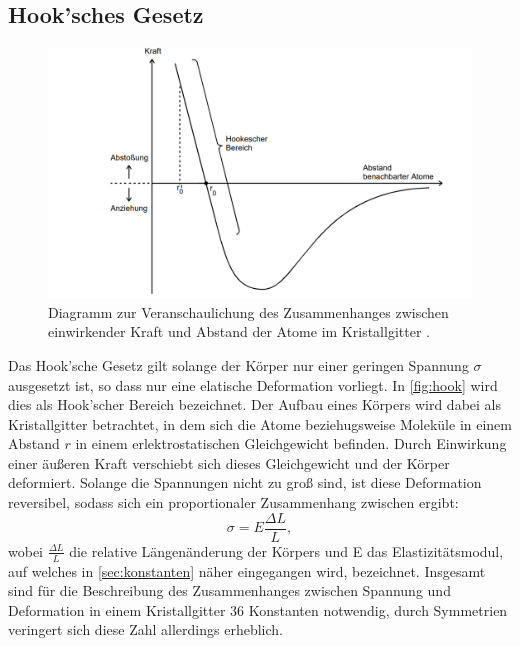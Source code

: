     \subsection{Hook'sches Gesetz}
    \label{sec:hook}
    \begin{figure}
        \centering
        \includegraphics[width=\textwidth]{content/hook.png}
        \caption{Diagramm zur Veranschaulichung des Zusammenhanges zwischen einwirkender Kraft und Abstand der Atome im Kristallgitter \cite[93]{V102}.}
        \label{fig:hook}
    \end{figure}
    Das Hook'sche Gesetz gilt solange der Körper nur einer geringen Spannung $\sigma$ ausgesetzt ist, so dass nur eine elatische 
    Deformation vorliegt. In \autoref{fig:hook} wird dies als Hook'scher Bereich bezeichnet. Der Aufbau eines Körpers wird dabei
    als Kristallgitter betrachtet, in dem sich die Atome beziehugsweise Moleküle in einem Abstand $r$ in einem erlektrostatischen
    Gleichgewicht befinden. Durch Einwirkung einer äußeren Kraft verschiebt sich dieses Gleichgewicht und der Körper deformiert.
    Solange die Spannungen nicht zu groß sind, ist diese Deformation reversibel, sodass sich ein proportionaler Zusammenhang zwischen
    ergibt:
    \begin{equation}
    \label{eqn:hook}
        \sigma = E \frac {\Delta L} {L},
    \end{equation}     
    wobei $\frac {\Delta L}{L}$ die relative Längenänderung der Körpers und E das Elastizitätsmodul, auf welches in \autoref{sec:konstanten}
    näher eingegangen wird, bezeichnet.
    Insgesamt sind für die Beschreibung des Zusammenhanges zwischen Spannung und Deformation in einem Kristallgitter 36 Konstanten
    notwendig, durch Symmetrien veringert sich diese Zahl allerdings erheblich. 
